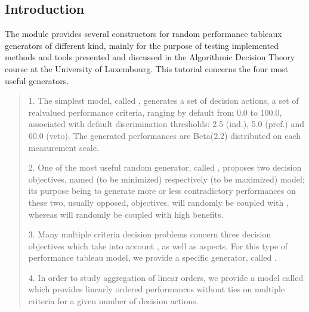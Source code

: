 \documentclass[a4paper,10pt,english]{sphinxhowto}
\begin{document}
\subsection{Introduction}
\label{\detokenize{tutorial:introduction}}
The  module provides several constructors for random performance tableaux generators of different kind, mainly for the purpose of testing implemented methods and tools presented and discussed in the Algorithmic Decision Theory course at the University of Luxembourg. This tutorial concerns the four most useful generators.
\begin{quote}

1. The simplest model, called , generates
a set of  decision actions, a set of  real\sphinxhyphen{}valued
performance criteria, ranging by default from 0.0 to 100.0,
associated with default discrimination thresholds: 2.5 (ind.),
5.0 (pref.) and 60.0 (veto). The generated performances are
Beta(2.2) distributed on each measurement scale.

2. One of the most useful random generator, called
, proposes two decision objectives,
named  (to be minimized) respectively  (to be
maximized) model; its purpose being to generate more or less
contradictory performances on these two, usually opposed,
objectives.  will randomly be coupled with , whereas  will randomly be coupled
with high benefits.

3. Many multiple criteria decision problems concern three decision
objectives which take into account ,  as well
as  aspects. For this type of performance tableau model,
we provide a specific generator,
called .

4. In order to study aggregation of linear orders, we provide a model
called  which provides linearly
ordered performances without ties on multiple criteria for
a given number of decision actions.
\end{quote}
\end{document}
